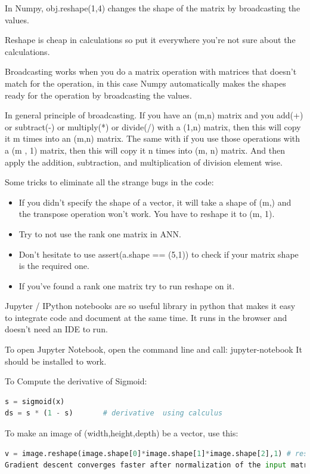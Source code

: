 In Numpy, obj.reshape(1,4) changes the shape of the matrix by broadcasting the values.

Reshape is cheap in calculations so put it everywhere you're not sure about the calculations.

Broadcasting works when you do a matrix operation with matrices that doesn't match for the operation, in this case Numpy automatically makes the shapes ready for the operation by broadcasting the values.

In general principle of broadcasting. If you have an (m,n) matrix and you add(+) or subtract(-) or multiply(*) or divide(/) with a (1,n) matrix, then this will copy it m times into an (m,n) matrix. The same with if you use those operations with a (m , 1) matrix, then this will copy it n times into (m, n) matrix. And then apply the addition, subtraction, and multiplication of division element wise.

Some tricks to eliminate all the strange bugs in the code:

\begin{itemize}
    \item If you didn't specify the shape of a vector, it will take a shape of (m,) and the transpose operation won't work. You have to reshape it to (m, 1).
    \item Try to not use the rank one matrix in ANN.
    \item Don't hesitate to use assert(a.shape == (5,1)) to check if your matrix shape is the required one.
    \item If you've found a rank one matrix try to run reshape on it.
\end{itemize}

Jupyter / IPython notebooks are so useful library in python that makes it easy to integrate code and document at the same time. It runs in the browser and doesn't need an IDE to run.

To open Jupyter Notebook, open the command line and call: jupyter-notebook It should be installed to work.

To Compute the derivative of Sigmoid:
\begin{lstlisting}[language=python]
s = sigmoid(x)
ds = s * (1 - s)       # derivative  using calculus
\end{lstlisting}

To make an image of (width,height,depth) be a vector, use this:

\begin{lstlisting}[language=python]
v = image.reshape(image.shape[0]*image.shape[1]*image.shape[2],1) # reshapes the image.
Gradient descent converges faster after normalization of the input matrices.
\end{lstlisting}


